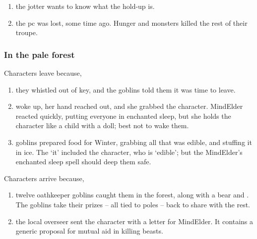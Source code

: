 \begin{multicols}{2}
{  \begin{enumerate}
    \item
    the \gls{jotter} wants to know what the hold-up is.
    \item
    the \gls{pc} was lost, some time ago.
    Hunger and monsters killed the rest of their troupe.
  \end{enumerate}

  \subsubsection{In the pale forest}

  Characters leave because,

  \begin{enumerate}
    \item
    they whistled out of key, and the goblins told them it was time to leave.
    \item
     woke up, her hand reached out, and she grabbed the character.
    \gls{MindElder} reacted quickly, putting everyone in enchanted sleep, but she holds the character like a child with a doll; best not to wake them.
    \item
    goblins prepared food for Winter, grabbing all that was edible, and stuffing it in ice.
    The `it' included the character, who is `edible'; but the \gls{MindElder}'s enchanted sleep spell should deep them safe.
  \end{enumerate}

  Characters arrive because,

  \begin{enumerate}
    \item
    twelve oathkeeper goblins caught them in the forest, along with a bear and .
    The goblins take their prizes -- all tied to poles -- back to share with the rest.
    \item
    the local overseer sent the character with a letter for \gls{MindElder}.
    It contains a generic proposal for mutual aid in killing beasts.
  \end{enumerate}

}

\end{multicols}

